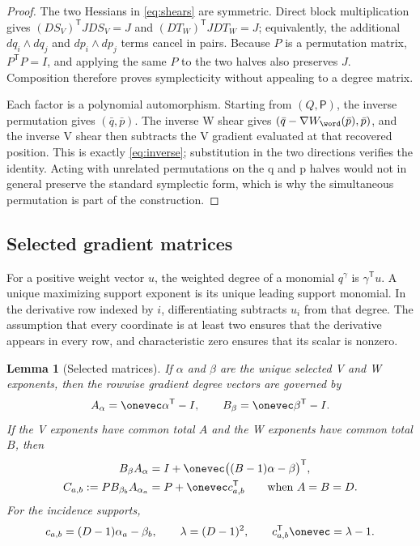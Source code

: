 \documentclass[11pt,letterpaper]{article}
\newtheorem{lemma}[theorem]{Lemma}
\theoremstyle{definition}
\theoremstyle{remark}
\numberwithin{equation}{section}
\begin{document}
\begin{proof}
The two Hessians in \eqref{eq:shears} are symmetric.  Direct block
multiplication gives \((DS_V)^{\mathsf T}JDS_V=J\) and
\((DT_W)^{\mathsf T}JDT_W=J\); equivalently, the additional
\(dq_i\wedge dq_j\) and \(dp_i\wedge dp_j\) terms cancel in pairs.  Because
\(P\) is a permutation matrix, \(P^{\mathsf T}P=I\), and applying the same
\(P\) to the two halves also preserves \(J\).  Composition therefore proves
symplecticity without appealing to a degree matrix.

Each factor is a polynomial automorphism.  Starting from \((Q,\mathsf P)\),
the inverse permutation gives \((\bar q,\bar p)\).  The inverse W shear gives
\((\bar q-\nabla W_{\word}(\bar p),\bar p)\), and the inverse V shear then
subtracts the V gradient evaluated at that recovered position.  This is
exactly \eqref{eq:inverse}; substitution in the two directions verifies the
identity.  Acting with unrelated permutations on the q and p halves would
not in general preserve the standard symplectic form, which is why the
simultaneous permutation is part of the construction.
\end{proof}

\subsection{Selected gradient matrices}

For a positive weight vector \(u\), the weighted degree of a monomial
\(q^\gamma\) is \(\gamma^{\mathsf T}u\).  A unique maximizing support
exponent is its unique leading support monomial.  In the derivative row
indexed by \(i\), differentiating subtracts \(u_i\) from that degree.  The
assumption that every coordinate is at least two ensures that the derivative
appears in every row, and characteristic zero ensures that its scalar is
nonzero.

\begin{lemma}[Selected matrices]
\label{lem:selected-matrices}
If \(\alpha\) and \(\beta\) are the unique selected V and W exponents, then
the rowwise gradient degree vectors are governed by
\begin{equation}
 A_\alpha=\onevec\alpha^{\mathsf T}-I,
 \qquad
 B_\beta=\onevec\beta^{\mathsf T}-I.
 \label{eq:selected-matrices}
\end{equation}
If the V exponents have common total \(A\) and the W exponents have common
total \(B\), then
\begin{equation}
 \begin{aligned}
 B_\beta A_\alpha
   &=I+\onevec\bigl((B-1)\alpha-\beta\bigr)^{\mathsf T},\\
 C_{a,b}:=PB_{\beta_b}A_{\alpha_a}
   &=P+\onevec c_{a,b}^{\mathsf T}
   \qquad\text{when }A=B=D.
 \end{aligned}
 \label{eq:rank-one-product}
\end{equation}
For the incidence supports,
\begin{equation}
 c_{a,b}=(D-1)\alpha_a-\beta_b,
 \qquad
 \lambda=(D-1)^2,
 \qquad
 c_{a,b}^{\mathsf T}\onevec=\lambda-1.
 \label{eq:digit-definition}
\end{equation}
\end{lemma}
\end{document}

